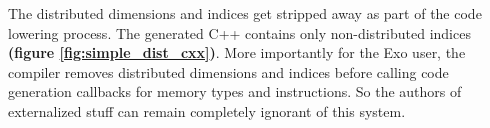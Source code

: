 \filbreak
{} The distributed dimensions and indices get stripped away as part of the code lowering process.
The generated C++ contains only non-distributed indices \textbf{(figure \ref{fig:simple_dist_cxx})}.
More importantly for the Exo user, the compiler removes distributed dimensions and indices before calling code generation callbacks for memory types and instructions.
So the authors of externalized stuff can remain completely ignorant of this system.

\filbreak
{}

\filbreak
{}


